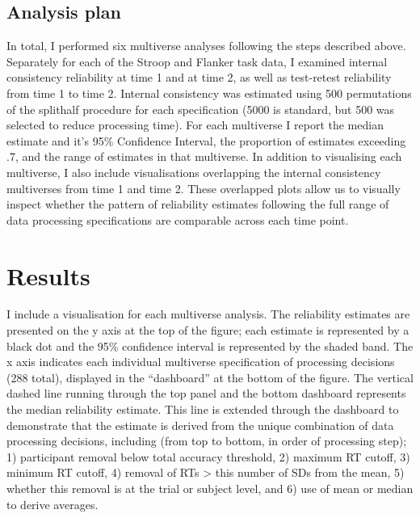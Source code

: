 \documentclass[english,man,floatsintext]{apa6}
\begin{document}
\hypertarget{analysis-plan}{%
\subsection{Analysis plan}\label{analysis-plan}}

In total, I performed six multiverse analyses following the steps described above. Separately for each of the Stroop and Flanker task data, I examined internal consistency reliability at time 1 and at time 2, as well as test-retest reliability from time 1 to time 2. Internal consistency was estimated using 500 permutations of the splithalf procedure for each specification (5000 is standard, but 500 was selected to reduce processing time). For each multiverse I report the median estimate and it's 95\% Confidence Interval, the proportion of estimates exceeding .7, and the range of estimates in that multiverse. In addition to visualising each multiverse, I also include visualisations overlapping the internal consistency multiverses from time 1 and time 2. These overlapped plots allow us to visually inspect whether the pattern of reliability estimates following the full range of data processing specifications are comparable across each time point.

\hypertarget{results}{%
\section{Results}\label{results}}

I include a visualisation for each multiverse analysis. The reliability estimates are presented on the y axis at the top of the figure; each estimate is represented by a black dot and the 95\% confidence interval is represented by the shaded band. The x axis indicates each individual multiverse specification of processing decisions (288 total), displayed in the \enquote{dashboard} at the bottom of the figure. The vertical dashed line running through the top panel and the bottom dashboard represents the median reliability estimate. This line is extended through the dashboard to demonstrate that the estimate is derived from the unique combination of data processing decisions, including (from top to bottom, in order of processing step); 1) participant removal below total accuracy threshold, 2) maximum RT cutoff, 3) minimum RT cutoff, 4) removal of RTs \textgreater{} this number of SDs from the mean, 5) whether this removal is at the trial or subject level, and 6) use of mean or median to derive averages.

\newpage
\end{document}
